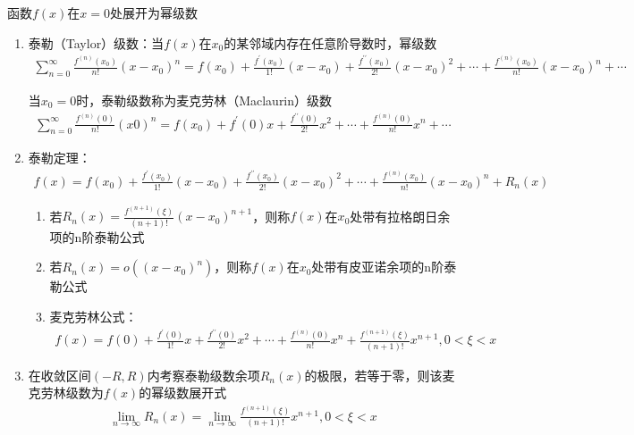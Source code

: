 \documentclass[12pt]{book}
\begin{document}
函数$f(x)$在$x=0$处展开为幂级数
\begin{enumerate}[1.]
    \item 泰勒（Taylor）级数：当$f(x)$在$x_0$的某邻域内存在任意阶导数时，幂级数
          \begin{gather*}
              \sum_{n=0}^{\infty}{
              \frac{f^{(n)}(x_0)}{n!}(x-x_0)^n
              } =
              f(x_0)+
              \frac{f^\prime(x_0)}{1!}(x-x_0)+
              \frac{f^{\prime\prime}(x_0)}{2!}(x-x_0)^{2}+\cdots+
              \frac{f^{(n)}(x_0)}{n!}(x-x_0)^{n}+\cdots
          \end{gather*}
          \par 当$x_0=0$时，泰勒级数称为麦克劳林（Maclaurin）级数
          \begin{gather*}
              \sum_{n=0}^{\infty}{
              \frac{f^{(n)}(0)}{n!}(x0)^n
              } =
              f(x_0)+
              f^\prime(0)x+
              \frac{f^{\prime\prime}(0)}{2!}x^{2}+\cdots+
              \frac{f^{(n)}(0)}{n!}x^{n}+\cdots
          \end{gather*}
    \item 泰勒定理：
          \begin{gather*}
              f(x) = f(x_0)+
              \frac{f^\prime(x_0)}{1!}(x-x_0)+
              \frac{f^{\prime\prime}(x_0)}{2!}(x-x_0)^{2}+\cdots+
              \frac{f^{(n)}(x_0)}{n!}(x-x_0)^{n}+R_{n}(x)
          \end{gather*}
          \begin{enumerate}[(1)]
              \item 若$R_{n}(x)=\frac{f^{(n+1)}(\xi)}{(n+1)!}(x-x_0)^{n+1}$，则称$f(x)$在$x_{0}$处带有拉格朗日余项的n阶泰勒公式
              \item 若$R_{n}(x)=o((x-x_{0})^{n})$，则称$f(x)$在$x_{0}$处带有皮亚诺余项的n阶泰勒公式
              \item 麦克劳林公式：
                    \begin{gather*}
                        f(x) = f(0)+
                        \frac{f^\prime(0)}{1!}x+
                        \frac{f^{\prime\prime}(0)}{2!}x^{2}+\cdots+
                        \frac{f^{(n)}(0)}{n!}x^{n}+\frac{f^{(n+1)}(\xi)}{(n+1)!}x^{n+1}, 0<\xi<x
                    \end{gather*}
          \end{enumerate}
    \item 在收敛区间$(-R,R)$内考察泰勒级数余项$R_{n}(x)$的极限，若等于零，则该麦克劳林级数为$f(x)$的幂级数展开式
          \begin{gather*}
              \lim_{n\rightarrow\infty}{R_{n}(x)} = \lim_{n\rightarrow\infty}{\frac{f^{(n+1)}(\xi)}{(n+1)!}x^{n+1}}, 0<\xi<x
          \end{gather*}
\end{enumerate}
\end{document}
